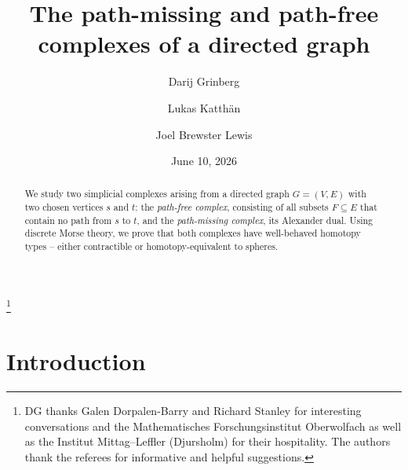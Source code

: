 \documentclass[12pt]{amsart}
\theoremstyle{definition}
\begin{document}
\title{The path-missing and path-free complexes of a directed graph}

\date{June 10, 2026}

\author{Darij Grinberg}

\address{Drexel University,
Korman Center, Room 263,
15 S 33rd Street,
Philadelphia, PA, 19104,
USA}

\author{Lukas Katth\"an}

\address{Goethe-University Frankfurt, Institute of Mathematics, Robert-Mayer-Str. 10, 60325 Frankfurt am Main, Germany}

\author{Joel Brewster Lewis}

\address{George Washington University,
Phillips Hall, Room 707,
801 22nd St NW,
Washington, DC 20052 USA}


\thanks{DG thanks Galen Dorpalen-Barry and Richard Stanley for interesting conversations and the Mathematisches Forschungsinstitut Oberwolfach as well as the Institut Mittag--Leffler (Djursholm) for their hospitality.
The authors thank the referees for informative and helpful suggestions.}

\begin{abstract}
We study two simplicial complexes arising from a directed graph
$G = (V, E)$ with two chosen vertices $s$ and $t$:
the \emph{path-free complex},
consisting of all subsets $F \subseteq E$ that contain no path
from $s$ to $t$, and the \emph{path-missing complex},
its Alexander dual.
Using discrete Morse theory, we prove that both complexes have
well-behaved homotopy types -- either contractible or
homotopy-equivalent to spheres.
\end{abstract}

\maketitle

\section{Introduction}
\end{document}
